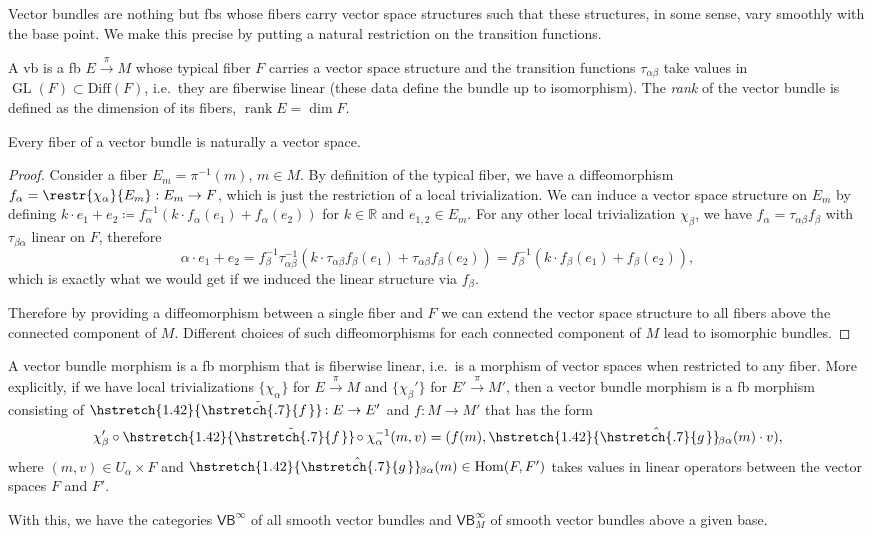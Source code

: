 \documentclass[english,letterpaper]{article}%
\numberwithin{equation}{section}
\numberwithin{figure}{section}
\numberwithin{table}{section}
\theoremstyle{definition}
\theoremstyle{definition}
\theoremstyle{definition}
\theoremstyle{plain}
\theoremstyle{plain}
\theoremstyle{plain}
\theoremstyle{plain}
\theoremstyle{remark}
\theoremstyle{remark}
\DeclareMathOperator{\rank}{rank}
\DeclareMathOperator{\Hom}{Hom}
\DeclareMathOperator{\GL}{GL}
\newcommand\wh[1]{\hstretch{1.42}{\hat{\hstretch{.7}{#1\mkern2mu}}}\mkern-2mu} %
\newcommand\wt[1]{\hstretch{1.42}{\tilde{\hstretch{.7}{#1\mkern2mu}}}\mkern-2mu}
\begin{document}
Vector bundles are nothing but \glspl{fb} whose fibers carry vector space structures such that these structures, in some sense, vary smoothly with the base point. We make this precise by putting a natural restriction on the transition functions.

\begin{defn}
A \gls{vb} is a \gls{fb} $E\overset{\pi}{\to}M$ whose typical fiber $F$ carries a vector space structure and the transition functions $\tau_{\alpha\beta}$ take values in $\GL(F)\subset \mathrm{Diff}(F)$, i.e.\ they are fiberwise linear (these data define the bundle up to isomorphism). The \emph{rank} of the vector bundle is defined as the dimension of its fibers, $\rank E=\dim F$.
\end{defn}

\begin{prop}
Every fiber of a vector bundle is naturally a vector space.
\end{prop}
\begin{proof}
Consider a fiber $E_m=\pi^{-1}(m)$, $m\in M$. By definition of the typical fiber, we have a diffeomorphism $f_\alpha=\restr{\chi_\alpha}{E_m}:E_m\to F$, which is just the restriction of a local trivialization. We can induce a vector space structure on $E_m$ by defining $k\cdot e_1+e_2\coloneqq f_\alpha^{-1}(k\cdot f_\alpha(e_1)+f_\alpha(e_2))$ for $k\in \mathbb{R}$ and $e_{1,2}\in E_m$. For any other local trivialization $\chi_\beta$, we have $f_\alpha=\tau_{\alpha\beta}f_\beta$ with $\tau_{\beta\alpha}$ linear on $F$, therefore 
\[
\alpha\cdot e_1+e_2=f_\beta^{-1}\tau_{\alpha\beta}^{-1}(k\cdot \tau_{\alpha\beta}f_\beta(e_1)+\tau_{\alpha\beta}f_\beta(e_2))=f_\beta^{-1}(k\cdot f_\beta(e_1)+f_\beta(e_2)),
\] 
which is exactly what we would get if we induced the linear structure via $f_\beta$.

Therefore by providing a diffeomorphism between a single fiber and $F$ we can extend the vector space structure to all fibers above the connected component of $M$. Different choices of such diffeomorphisms for each connected component of $M$ lead to isomorphic bundles.
\end{proof}

\begin{defn}
A vector bundle morphism is a \gls{fb} morphism that is fiberwise linear, i.e.\ is a morphism of vector spaces when restricted to any fiber. More explicitly, if we have  local trivializations $\{\chi_\alpha\}$ for $E\overset{\pi}{\to}M$ and $\{\chi_\beta'\}$ for $E'\overset{\pi}{\to}M'$, then a vector bundle morphism is a \gls{fb} morphism consisting of $\wt{f}:E\to E'$ and $f:M\to M'$ that has the form 
\[\chi_\beta '\circ \wt{f} \circ \chi_\alpha^{-1}(m,v)=(f(m),\wh{g}_{\beta\alpha}(m)\cdot v),\]
where $(m,v)\in U_\alpha\times F$ and $\wh{g}_{\beta\alpha}(m)\in \Hom(F,F')$ takes values in linear operators between the vector spaces $F$ and $F'$.

With this, we have the categories $\mathsf{VB}^\infty $ of all smooth vector bundles and $\mathsf{VB}^\infty_M$ of smooth vector bundles above a given base.
\end{defn}
\end{document}
